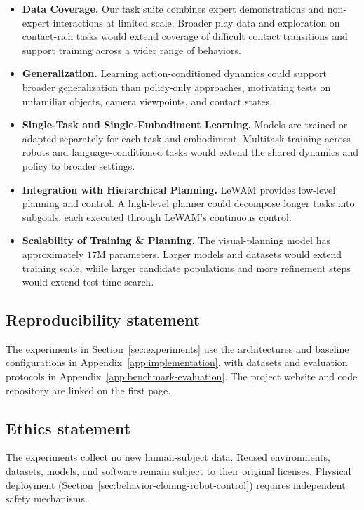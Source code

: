 \documentclass{article} %
\newcommand{\methodname}[1]{\textup{#1}}
\newcommand{\method}{\methodname{LeWAM}}
\begin{document}
\begin{itemize}[leftmargin=*,itemsep=0.25em,topsep=0.25em]
    \item \textbf{Data Coverage.} Our task suite combines expert demonstrations and non-expert interactions at limited scale. Broader play data and exploration on contact-rich tasks would extend coverage of difficult contact transitions and support training across a wider range of behaviors.

    \item \textbf{Generalization.} Learning action-conditioned dynamics could support broader generalization than policy-only approaches, motivating tests on unfamiliar objects, camera viewpoints, and contact states.

    \item \textbf{Single-Task and Single-Embodiment Learning.} Models are trained or adapted separately for each task and embodiment. Multitask training across robots and language-conditioned tasks would extend the shared dynamics and policy to broader settings.

    \item \textbf{Integration with Hierarchical Planning.} \method{} provides low-level planning and control. A high-level planner could decompose longer tasks into subgoals, each executed through LeWAM's continuous control.
    \item \textbf{Scalability of Training \& Planning.} The visual-planning model has approximately $17\text{M}$ parameters. Larger models and datasets would extend training scale, while larger candidate populations and more refinement steps would extend test-time search.
\end{itemize}

\subsection*{Reproducibility statement}
The experiments in Section~\ref{sec:experiments} use the
architectures and baseline configurations in Appendix~\ref{app:implementation},
with datasets and evaluation protocols in Appendix~\ref{app:benchmark-evaluation}.
The project website and code repository are linked on the first page.


\subsection*{Ethics statement}
The experiments collect no new human-subject data.
Reused environments, datasets, models, and software remain subject to their original
licenses.
Physical deployment (Section~\ref{sec:behavior-cloning-robot-control}) requires independent safety mechanisms.
\end{document}
